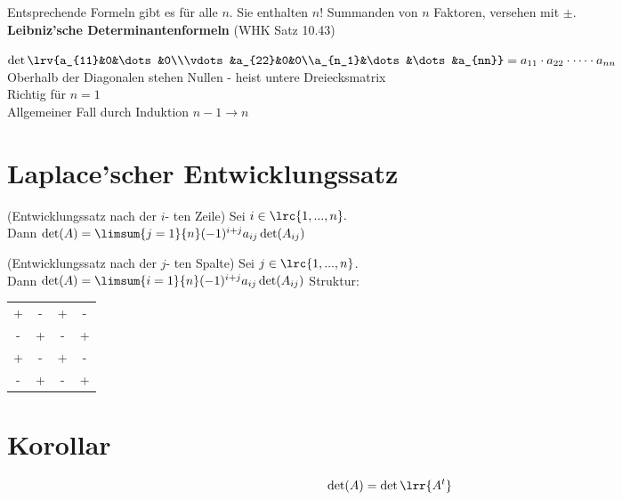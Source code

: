 			Entsprechende Formeln gibt es für alle $n$. Sie enthalten $n!$ Summanden von $n$ Faktoren, versehen mit $\pm$.\\
			\textbf{Leibniz'sche Determinantenformeln} (WHK Satz 10.43)
		\item $\det\lrv{a_{11}&0&\dots&0\\\vdots&a_{22}&0&0\\a_{n_1}&\dots&\dots&a_{nn}}=a_{11}\cdot a_{22}\cdot\dots\cdot a_{nn}$\\
			Oberhalb der Diagonalen stehen Nullen - heist untere Dreiecksmatrix\\
			Richtig für $n=1$\\
			Allgemeiner Fall durch Induktion $n-1\rightarrow n$\\
  \subExEnd

\section{Laplace'scher Entwicklungssatz}
    \item (Entwicklungssatz nach der $i$- ten Zeile)
      Sei $i\in\lrc{1,...,n}.$\\
      Dann $\det(A)=\limsum{j=1}{n}(-1)^{i+j}a_{ij}\det(A_{ij})$
    \item (Entwicklungssatz nach der $j$- ten Spalte)
      Sei $j\in\lrc{1,...,n}$.\\
      Dann $\det(A)=\limsum{i=1}{n}(-1)^{i+j}a_{ij}\det(A_{ij})$
  \subExEnd
  Struktur:\begin{tabular}{cccc}+&-&+&-\\-&+&-&+\\+&-&+&-\\-&+&-&+\end{tabular}

\section{Korollar}
  \[\det(A)=\det\lrr{A^t}\]

